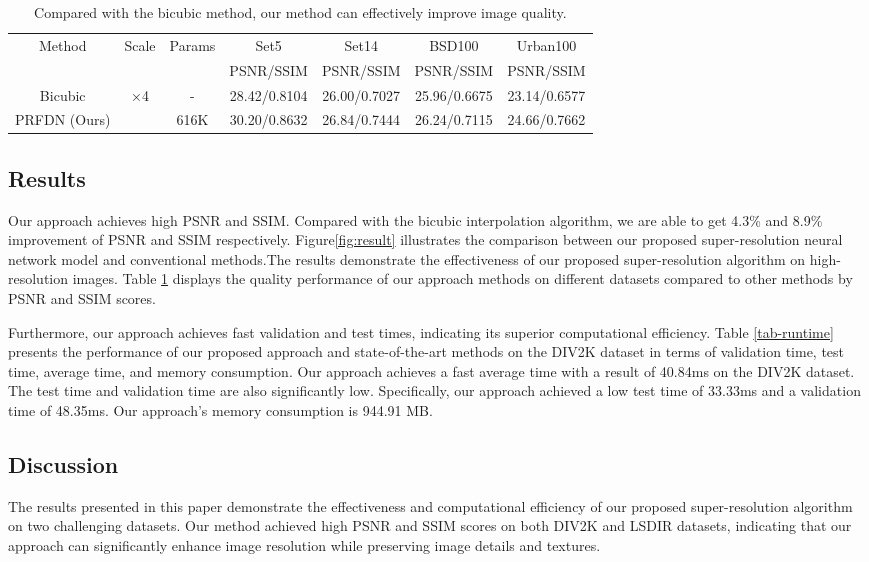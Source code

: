 \documentclass[10pt,twocolumn,letterpaper]{article}
\begin{document}
\begin{table}[t]
    \caption{Compared with the bicubic method, our method can effectively improve image quality.}
    \resizebox{\columnwidth}{!}
    {
        \begin{tabular}{|c|c|c|c|c|c|c|}
        \hline
        \multirow{2}{*}{Method} & \multirow{2}{*}{Scale} & \multirow{2}{*}{Params} & Set5  & Set14 & BSD100 & Urban100  \\
    \cline{4-7}          &       &       & PSNR/SSIM & PSNR/SSIM & PSNR/SSIM & PSNR/SSIM  \\
        \hline
        Bicubic & \multirow{2}[2]{*}{×4} & -     & 28.42/0.8104 & 26.00/0.7027 & 25.96/0.6675 & 23.14/0.6577  \\
        PRFDN (Ours) &       & 616K  & 30.20/0.8632 & 26.84/0.7444 & 26.24/0.7115 & 24.66/0.7662 \\
        \hline
        \end{tabular}%
    }
    \label{tab-quality}
\end{table}%
\subsection{Results}
Our approach achieves high PSNR and SSIM. Compared with the bicubic interpolation algorithm, we are able to get 4.3\% and 8.9\% improvement of PSNR and SSIM respectively. Figure\ref{fig:result} illustrates the comparison between our proposed super-resolution neural network model and conventional methods.The results demonstrate the effectiveness of our proposed super-resolution algorithm on high-resolution images. Table \ref{tab-quality} displays the quality performance of our approach methods on different datasets compared to other methods by PSNR and SSIM scores.

Furthermore, our approach achieves fast validation and test times, indicating its superior computational efficiency. Table \ref{tab-runtime} presents the performance of our proposed approach and state-of-the-art methods on the DIV2K dataset in terms of validation time, test time, average time, and memory consumption. Our approach achieves a fast average time with a result of 40.84ms on the DIV2K dataset. The test time and validation time are also significantly low. Specifically, our approach achieved a low test time of 33.33ms and a validation time of 48.35ms. Our approach's memory consumption is 944.91 MB.


\subsection{Discussion}
The results presented in this paper demonstrate the effectiveness and computational efficiency of our proposed super-resolution algorithm on two challenging datasets. Our method achieved high PSNR and SSIM scores on both DIV2K and LSDIR datasets, indicating that our approach can significantly enhance image resolution while preserving image details and textures.
\end{document}
